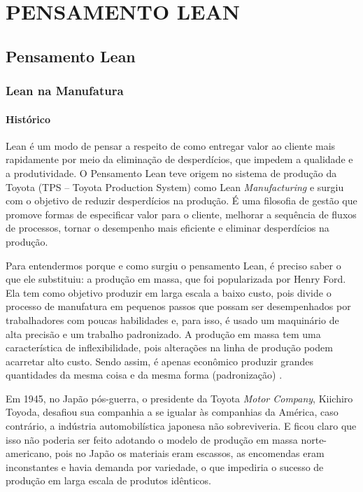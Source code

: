 \part{PENSAMENTO LEAN}

\chapter[Pensamento Lean]{Pensamento Lean}



\section[Lean na Manufatura]{Lean na Manufatura}

\subsection[Histórico]{Histórico}

Lean é um modo de pensar a respeito de como entregar valor ao cliente mais rapidamente por meio da eliminação de desperdícios, que impedem a qualidade e a produtividade. O Pensamento Lean teve origem no sistema de produção da Toyota (TPS – Toyota Production System) como Lean \textit{Manufacturing} e surgiu com o objetivo de reduzir desperdícios na produção. É uma filosofia de gestão que promove formas de especificar valor para o cliente, melhorar a sequência de fluxos de processos, tornar o desempenho mais eficiente e eliminar desperdícios na produção. 

Para entendermos porque e como surgiu o pensamento Lean, é preciso saber o que ele substituiu: a produção em massa, que foi popularizada por Henry Ford. Ela tem como objetivo produzir em larga escala a baixo custo, pois divide o processo de manufatura em pequenos passos que possam ser desempenhados por trabalhadores com poucas habilidades e, para isso, é usado um maquinário de alta precisão e um trabalho padronizado. A produção em massa tem uma característica de inflexibilidade, pois alterações na linha de produção podem acarretar alto custo. Sendo assim, é apenas econômico produzir grandes quantidades da mesma coisa e da mesma forma (padronização) \cite{hibbs2009}. 

Em 1945, no Japão pós-guerra, o presidente da Toyota \textit{Motor Company}, Kiichiro Toyoda, desafiou sua companhia a se igualar às companhias da América, caso contrário, a indústria automobilística japonesa não sobreviveria. E ficou claro que isso não poderia ser feito adotando o modelo de produção em massa norte-americano, pois no Japão os materiais eram escassos, as encomendas eram inconstantes e havia demanda por variedade, o que impediria o sucesso de produção em larga escala de produtos idênticos. 

